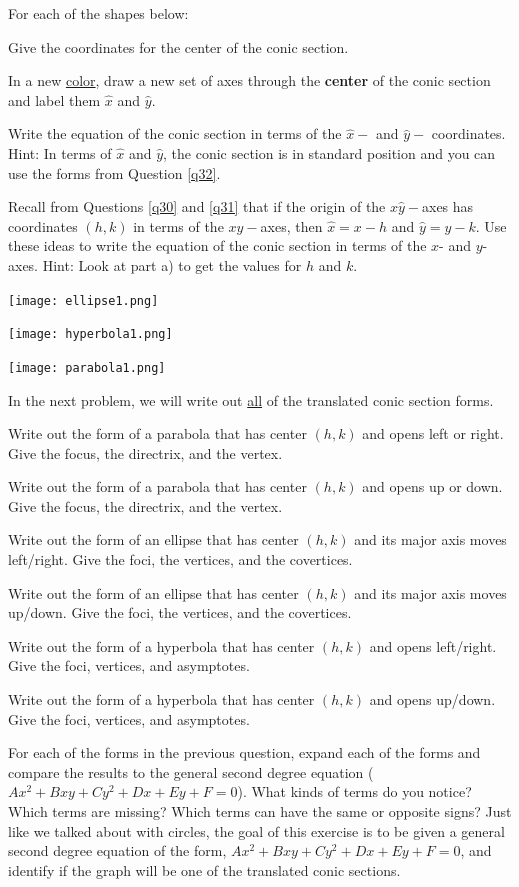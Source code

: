 \bq For each of the shapes below:
\be
\item Give the coordinates for the center of the conic section.
\item In a new \underline{color}, draw a new set of axes through the \textbf{center} of the conic section and label them $\hat{x}$ and $\hat{y}$.
\item Write the equation of the conic section in terms of the $\hat{x}-$ and $\hat{y}-$ coordinates. Hint: In terms of $\hat{x}$ and $\hat{y}$, the conic section is in standard position and you can use the forms from Question \ref{q32}.
\item Recall from Questions \ref{q30} and \ref{q31} that if the origin of the $\hat{x}\hat{y}-$axes has coordinates  $(h,k)$ in terms of the $xy-$axes, then $\hat{x} =x-h$ and $\hat{y}=y-k$. Use these ideas to write the equation of the conic section in terms of the $x$- and $y$-axes. Hint: Look at part a) to get the values for $h$ and $k$.
\ee
\begin{center}\texttt{[image: ellipse1.png]}

\texttt{[image: hyperbola1.png]}

\texttt{[image: parabola1.png]} \end{center}
\eq
In the next problem, we will write out \underline{all} of the translated conic section forms.
\bq \be
\item Write out the form of a parabola that has center $(h,k)$ and opens left or right. Give the focus, the directrix, and the vertex.
\item Write out the form of a parabola that has center $(h,k)$ and opens up or down. Give the focus, the directrix, and the vertex.
\item Write out the form of an ellipse that has center $(h,k)$ and its major axis moves left/right. Give the foci, the vertices, and the covertices.
\item Write out the form of an ellipse that has center $(h,k)$ and its major axis moves up/down. Give the foci, the vertices, and the covertices.
\item Write out the form of a hyperbola that has center $(h,k)$ and opens left/right. Give the foci, vertices, and asymptotes.
\item Write out the form of a hyperbola that has center $(h,k)$ and opens up/down. Give the foci, vertices, and asymptotes.
\ee
\eq

\bq For each of the forms in the previous question, expand each of the forms  and compare the results to the general second degree equation ($Ax^2+Bxy+Cy^2+Dx+Ey+F=0$). What kinds of terms do you notice? Which terms are missing? Which terms can have the same or opposite signs? Just like we talked about with circles, the goal of this exercise is to be given a general second degree equation of the form, $Ax^2+Bxy+Cy^2+Dx+Ey+F=0$, and identify if the graph will be one of the translated conic sections.

